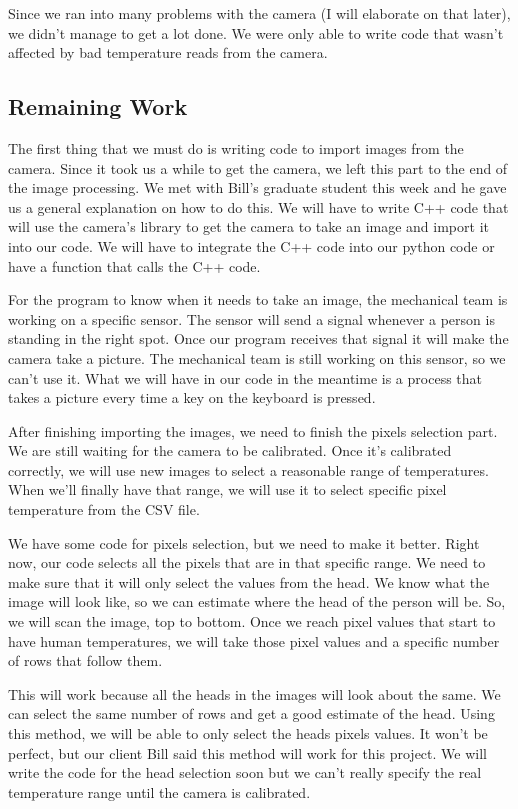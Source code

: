 \documentclass[onecolumn, draftclsnofoot,10pt, compsoc]{IEEEtran}
\begin{document}
Since we ran into many problems with the camera (I will elaborate on that later), we didn’t manage to get a lot done. We were only able to write code that wasn’t affected by bad temperature reads from the camera. 

\subsection{Remaining Work}

The first thing that we must do is writing code to import images from the camera. Since it took us a while to get the camera, we left this part to the end of the image processing. We met with Bill’s graduate student this week and he gave us a general explanation on how to do this. We will have to write C++ code that will use the camera’s library to get the camera to take an image and import it into our code. We will have to integrate the C++ code into our python code or have a function that calls the C++ code. 

For the program to know when it needs to take an image, the mechanical team is working on a specific sensor. The sensor will send a signal whenever a person is standing in the right spot. Once our program receives that signal it will make the camera take a picture. The mechanical team is still working on this sensor, so we can’t use it. What we will have in our code in the meantime is a process that takes a picture every time a key on the keyboard is pressed. 

After finishing importing the images, we need to finish the pixels selection part. We are still waiting for the camera to be calibrated. Once it’s calibrated correctly, we will use new images to select a reasonable range of temperatures. When we’ll finally have that range, we will use it to select specific pixel temperature from the CSV file. 

We have some code for pixels selection, but we need to make it better.  Right now, our code selects all the pixels that are in that specific range. We need to make sure that it will only select the values from the head. We know what the image will look like, so we can estimate where the head of the person will be. So, we will scan the image, top to bottom.  Once we reach pixel values that start to have human temperatures, we will take those pixel values and a specific number of rows that follow them. 

This will work because all the heads in the images will look about the same. We can select the same number of rows and get a good estimate of the head.  Using this method, we will be able to only select the heads pixels values. It won’t be perfect, but our client Bill said this method will work for this project. We will write the code for the head selection soon but we can’t really specify the real temperature range until the camera is calibrated. 
\end{document}
